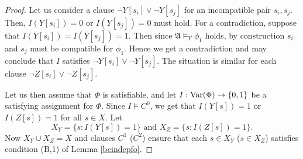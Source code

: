 \documentclass{article}
\theoremstyle{plain}
\theoremstyle{definition}
\newcommand{\mA}{{\mathfrak A}}
\newcommand{\Var}{{\rm Var}}
\begin{document}
\begin{proof}
 Let us consider a clause  $ \neg Y[s_i] \vee \neg Y[s_j]$ for an incompatible pair $s_i,s_j$. Then, $I(Y[s_i])=0$ or $I(Y[s_j])=0$ must hold. For a contradiction, suppose that $I(Y[s_i])=I(Y[s_j])=1$. Then since $\mA \models_Y \phi_1$ holds, by construction $s_i$ and $s_j$ must be compatible for $\phi_1$. Hence we get a contradiction and may conclude that $I$ satisfies $ \neg Y[s_i] \vee \neg Y[s_j]$. The situation is similar for each clause $\neg Z[s_i] \vee \neg Z[s_j]$. 

Let us then assume that  $\Phi$ is satisfiable, and let $I:\Var (\Phi)\rightarrow \{0,1\}$ be a satisfying assignment for $\Phi$. Since $I\models C^0$, we get that $I(Y[s])=1$ or $I(Z[s])=1$ for all  $s\in X$. Let 
   $$ X_{Y}=\{s : I(Y[s])=1\} \mbox{ and } X_{Z}=\{s : I(Z[s])=1\}.  $$
 Now $X_Y\cup X_Z=X$ and clauses $C^1$  ($C^2$) ensure that each $s\in X_Y$ ($s\in X_Z$) satisfies condition (B,1) of Lemma   \ref{bcindepfo}.
 

\end{proof}
\end{document}
